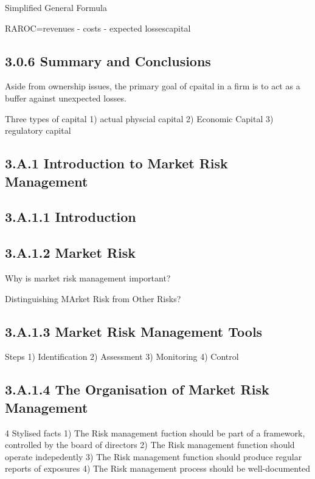 \documentclass[]{report}
\begin{document}
Simplified General Formula

RAROC=revenues - costs - expected lossescapital

\subsection*{3.0.6 Summary and Conclusions}


Aside from ownership issues, the primary goal of cpaital in a firm is to act as a buffer against unexpected losses.

Three types of capital
1) actual physcial capital
2) Economic Capital
3) regulatory capital


\subsection*{3.A.1 Introduction to Market Risk Management}

\subsection*{3.A.1.1 Introduction}

\subsection*{3.A.1.2 Market Risk}

Why is market risk management important?

Distinguishing MArket Risk from Other Risks?


\subsection{3.A.1.3 Market Risk Management Tools}

Steps
1) Identification
2) Assessment
3) Monitoring
4) Control

\subsection*{3.A.1.4 The Organisation of Market Risk Management}

4 Stylised facts
1) The Risk management fuction should be part of a framework, controlled by the board of directors
2) The Risk management function should operate indepedently
3) The Risk management function should produce regular reports of exposures
4) The Risk management process should be well-documented
\end{document}
